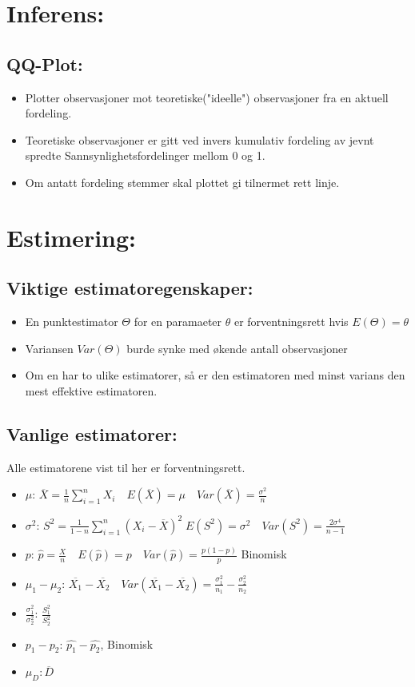 \documentclass[8pt,a4paper,twocolumn,twoside]{article}
\def\forvar#1#2#3{E(#1)=#2 \quad Var(#1)=#3}
\begin{document}
%
%
\section*{Inferens:}
%
%
\subsection*{QQ-Plot:}
\begin{itemize}[topsep=0pt,itemsep=0pt, partopsep=0pt]
    \item Plotter observasjoner mot teoretiske("ideelle") observasjoner fra en aktuell fordeling.
    \item Teoretiske observasjoner er gitt ved invers kumulativ fordeling av jevnt spredte Sannsynlighetsfordelinger
          mellom 0 og 1.
    \item Om antatt fordeling stemmer skal plottet gi tilnermet rett linje.
\end{itemize}
%
%
\section*{Estimering:}
%
%
\subsection*{Viktige estimatoregenskaper:}
\begin{itemize}[topsep=0pt,itemsep=0pt, partopsep=0pt]
    \item En punktestimator $\Theta$ for en paramaeter $\theta$ er forventningsrett hvis $E(\Theta)=\theta$
    \item Variansen $Var(\Theta)$ burde synke med økende antall observasjoner
    \item Om en har to ulike estimatorer, så er den estimatoren med minst varians den mest effektive estimatoren.
\end{itemize}
%
%
\subsection*{Vanlige estimatorer:}
Alle estimatorene vist til her er forventningsrett.
\begin{itemize}[topsep=0pt,itemsep=0pt, partopsep=0pt]
    \item $\mu$: $\overline{X}=\frac{1}{n}\sum_{i=1}^n X_i \quad \forvar{\overline{X}}{\mu}{\frac{\sigma^2}{n}}$
    \item $\sigma^2$: $S^2=\frac{1}{1-n}\sum_{i=1}^n(X_i-\overline{X})^2 \; \forvar{S^2}{\sigma^2}{\frac{2\sigma^4}{n-1}}$
    \item $p$: $\hat{p}=\frac{X}{n} \quad \forvar{\hat{p}}{p}{\frac{p(1-p)}{p}}$ Binomisk
    \item $\mu_1-\mu_2$: $\overline{X_1}-\overline{X_2} \quad Var(\overline{X_1}-\overline{X_2})=\frac{\sigma^2_1}{n_1}-\frac{\sigma^2_2}{n_2}$
    \item $\frac{\sigma^2_1}{\sigma^2_2}$: $\frac{S^2_1}{S^2_2}$
    \item $p_1-p_2$: $\hat{p_1}-\hat{p_2}$, Binomisk
    \item $\mu_D: \overline{D}$
\end{itemize}
%
%
\end{document}
